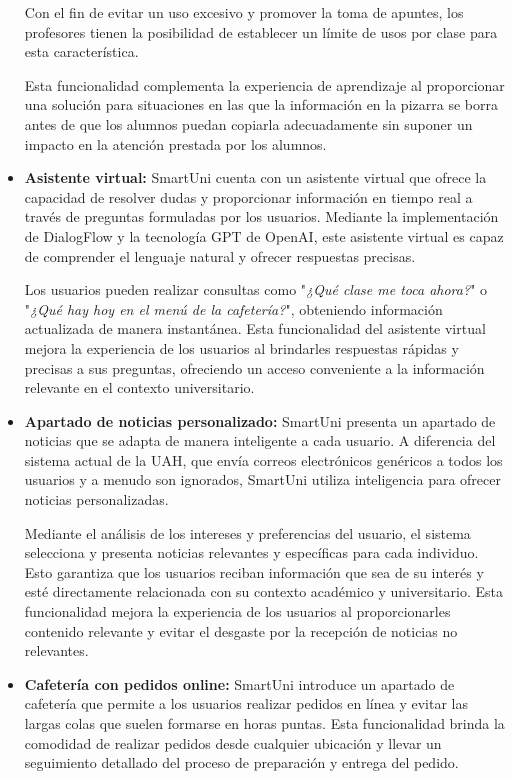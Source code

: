 \documentclass[12pt]{report}
\begin{document}
\begin{itemize}
Con el fin de evitar un uso excesivo y promover la toma de apuntes, los profesores tienen la posibilidad de establecer un límite de usos por clase para esta característica.

Esta funcionalidad complementa la experiencia de aprendizaje al proporcionar una solución para situaciones en las que la información en la pizarra se borra antes de que los alumnos puedan copiarla adecuadamente sin suponer un impacto en la atención prestada por los alumnos.

\item \textbf{Asistente virtual:} SmartUni cuenta con un asistente virtual que ofrece la capacidad de resolver dudas y proporcionar información en tiempo real a través de preguntas formuladas por los usuarios. Mediante la implementación de DialogFlow y la tecnología GPT de OpenAI, este asistente virtual es capaz de comprender el lenguaje natural y ofrecer respuestas precisas.

Los usuarios pueden realizar consultas como "\textit{¿Qué clase me toca ahora?}" o "\textit{¿Qué hay hoy en el menú de la cafetería?}", obteniendo información actualizada de manera instantánea. Esta funcionalidad del asistente virtual mejora la experiencia de los usuarios al brindarles respuestas rápidas y precisas a sus preguntas, ofreciendo un acceso conveniente a la información relevante en el contexto universitario.

\item \textbf{Apartado de noticias personalizado:} SmartUni presenta un apartado de noticias que se adapta de manera inteligente a cada usuario. A diferencia del sistema actual de la UAH, que envía correos electrónicos genéricos a todos los usuarios y a menudo son ignorados, SmartUni utiliza inteligencia para ofrecer noticias personalizadas.

Mediante el análisis de los intereses y preferencias del usuario, el sistema selecciona y presenta noticias relevantes y específicas para cada individuo. Esto garantiza que los usuarios reciban información que sea de su interés y esté directamente relacionada con su contexto académico y universitario. Esta funcionalidad mejora la experiencia de los usuarios al proporcionarles contenido relevante y evitar el desgaste por la recepción de noticias no relevantes.

\item \textbf{Cafetería con pedidos online:} SmartUni introduce un apartado de cafetería que permite a los usuarios realizar pedidos en línea y evitar las largas colas que suelen formarse en horas puntas. Esta funcionalidad brinda la comodidad de realizar pedidos desde cualquier ubicación y llevar un seguimiento detallado del proceso de preparación y entrega del pedido.


\end{itemize}
\end{document}
